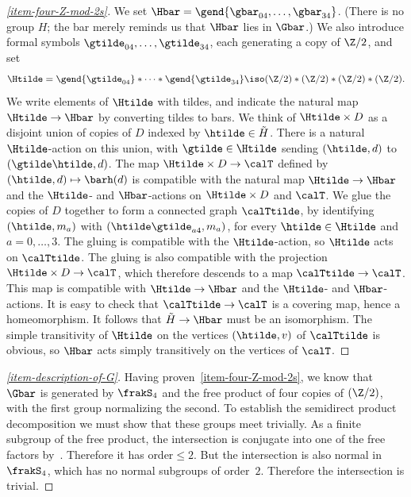 \begin{proofc}
\begin{proof}[\eqref{item-four-Z-mod-2s}]
We set $\Hbar=\gend{\gbar_{04},\dots,\gbar_{34}}$. (There is no group $H$; the bar merely reminds us that $\Hbar$ lies in $\Gbar$.) We also introduce formal symbols $\gtilde_{04},\dots,\gtilde_{34}$, each generating a copy of $\Z/2$, and set
\begin{equation*}
\Htilde=\gend{\gtilde_{04}}*\cdots*\gend{\gtilde_{34}}
\iso(\Z/2)*(\Z/2)*(\Z/2)*(\Z/2).
\end{equation*}
We write elements of $\Htilde$ with tildes, and indicate the natural map $\Htilde\to\Hbar$ by converting tildes to bars. We think of $\Htilde\times D$ as a disjoint union of copies of $D$ indexed by $\htilde\in\tilde{H}$. There is a natural $\Htilde$-action on this union, with $\gtilde\in\Htilde$ sending $(\htilde,d)$ to $(\gtilde\htilde,d)$. The map $\Htilde\times D\to\calT$ defined by $(\htilde,d)\mapsto \barh(d)$ is compatible with the natural map $\Htilde\to\Hbar$ and the $\Htilde$- and $\Hbar$-actions on $\Htilde\times D$ and $\calT$. We glue the copies of $D$ together to form a connected graph $\calTtilde$, by identifying $(\htilde,m_a)$ with $(\htilde\gtilde_{a4},m_a)$, for every $\htilde\in\Htilde$ and $a=0,\dots,3$. The gluing is compatible with the $\Htilde$-action, so $\Htilde$ acts on $\calTtilde$. The gluing is also compatible with the projection $\Htilde\times D\to\calT$, which therefore descends to a map $\calTtilde\to\calT$. This map is compatible with $\Htilde\to\Hbar$ and the $\Htilde$- and $\Hbar$-actions. It is easy to check that $\calTtilde\to\calT$ is a covering map, hence a homeomorphism. It follows that $\tilde{H}\to\Hbar$ must be an isomorphism. The simple transitivity of $\Htilde$ on the vertices $(\htilde,v)$ of $\calTtilde$ is obvious, so $\Hbar$ acts simply transitively on the vertices of $\calT$.
\let\qed\relax
\end{proof}

\begin{proof}[\eqref{item-description-of-G}]
Having proven~\eqref{item-four-Z-mod-2s}, we know that $\Gbar$ is generated by $\frakS_4$ and the free product of four copies of $(\Z/2)$, with the first group normalizing the second. To establish the semidirect product decomposition we must show that these groups meet trivially. As a finite subgroup of the free product, the intersection is conjugate into one of the free factors by~\cite[Theorem~8 of Section~I.4.3]{Trees}. Therefore it has order${ }\leq2$. But the intersection is also normal in $\frakS_4$, which has no normal subgroups of order~$2$. Therefore the intersection is trivial.
\end{proof}
\let\qed\relax
\end{proofc}

